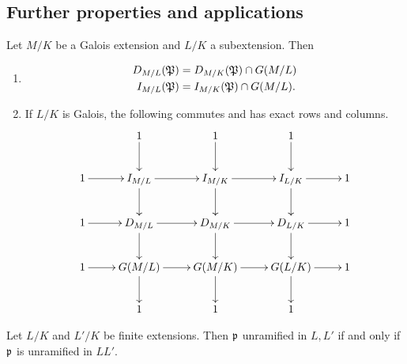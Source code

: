 \subsection{Further properties and applications}
\begin{thm}
Let $M/K$ be a Galois extension and $L/K$ a subextension. Then
\begin{enumerate}
\item 
\begin{align*}
D_{M/L}(\mathfrak{P})&=D_{M/K}(\mathfrak{P})\cap G(M/L)\\
I_{M/L}(\mathfrak{P})&=I_{M/K}(\mathfrak{P})\cap G(M/L).
\end{align*}
\item
If $L/K$ is Galois, the following commutes and has exact rows and columns.
\[
\xymatrix{
& 1\ar[d] & 1\ar[d] & 1\ar[d] & \\
1\ar[r] &I_{M/L}\ar[r]\ar[d]& I_{M/K} \ar[r]\ar[d] & I_{L/K} \ar[r]\ar[d] &1\\
1\ar[r] &D_{M/L}\ar[r]\ar[d]& D_{M/K} \ar[r]\ar[d] &D_{L/K} \ar[r]\ar[d] &1\\
1\ar[r] &G(M/L)\ar[r]\ar[d]& G(M/K) \ar[r]\ar[d] & G(L/K) \ar[r]\ar[d] &1\\
& 1 & 1 & 1 &
}
\]
\end{enumerate}
\end{thm}
\begin{thm}
Let $L/K$ and $L'/K$ be finite extensions. %
Then $\mathfrak{p}$ unramified in $L,L'$ if and only if $\mathfrak{p}$ is unramified in $LL'$.
\end{thm}
